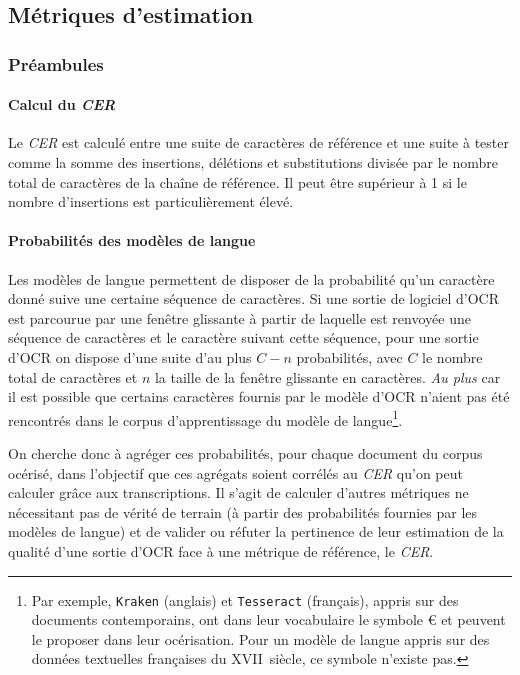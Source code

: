 \documentclass[10pt,twoside]{article}
\begin{document}
    \subsection{Métriques d'estimation}\label{metric}

    	\subsubsection{Préambules} 

	    	\paragraph{Calcul du \textit{CER}}
	    	Le \textit{CER} est calculé entre une suite de caractères de référence et une suite à tester comme la somme des 
	        insertions, délétions et substitutions divisée par le nombre total de caractères de la chaîne de référence. 
	        Il peut être supérieur à 1 si le nombre d'insertions est particulièrement élevé.

	        \paragraph{Probabilités des modèles de langue}\label{probaLM}
			Les modèles de langue permettent de disposer de la probabilité qu'un caractère donné suive une certaine séquence de 
		    caractères. Si une sortie de logiciel d'OCR est parcourue par une fenêtre glissante à partir de laquelle est renvoyée une
		    séquence de caractères et le caractère suivant cette séquence, pour une sortie d'OCR on dispose d'une suite d'au plus
		    $C - n$ probabilités, avec $C$ le nombre total de caractères et $n$ la taille de la fenêtre glissante en caractères.
		    \textit{Au plus} car il est possible que certains caractères fournis par le modèle d'OCR n'aient pas été rencontrés
		    dans le corpus d'apprentissage du modèle de langue\footnote{Par exemple,  \verb!Kraken! (anglais) et 
		    \verb!Tesseract! (français), appris sur des documents contemporains, ont dans leur vocabulaire le symbole \euro{} et peuvent le proposer
		    dans leur océrisation. Pour un modèle de langue appris sur des données textuelles françaises du XVII\ieme~siècle,
		    ce symbole n'existe pas.}. 

	    	On cherche donc à agréger ces probabilités, pour chaque document du corpus océrisé, dans l'objectif que ces agrégats
	    	soient corrélés au \textit{CER} qu'on peut calculer grâce aux transcriptions. Il s'agit de calculer d'autres métriques
	    	ne nécessitant pas de vérité de terrain (à partir des probabilités fournies par les modèles de langue) et de valider ou
	    	réfuter la pertinence de leur estimation de la qualité d'une sortie d'OCR face à une métrique de référence, le \textit{CER}.
\end{document}
